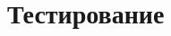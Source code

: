 \documentclass[../document.tex]{subfiles}
\begin{document}
    \section{Тестирование}
\end{document}

